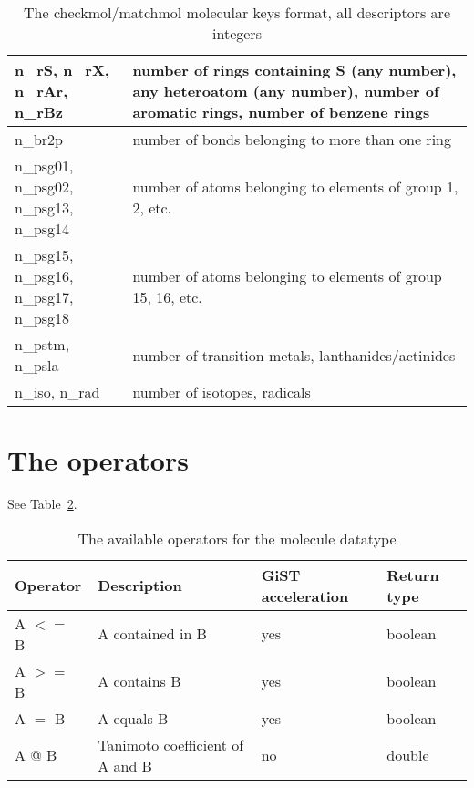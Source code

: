 \documentclass[a4paper]{article}
\begin{document}
\begin{table}[tbp]
\begin{tabular}{|l|p{8cm}|}
  \hline 
   n\_rS, n\_rX, n\_rAr, n\_rBz
  & number of rings containing S (any number), any heteroatom (any number), number of aromatic rings, number of benzene rings\\
  \hline 
   n\_br2p			& number of bonds belonging to more than one ring\\
   \hline 
   n\_psg01, n\_psg02, n\_psg13, n\_psg14
  & number of atoms belonging to elements of group 1, 2, etc.\\
  \hline 
   n\_psg15, n\_psg16, n\_psg17, n\_psg18
  & number of atoms belonging to elements of group 15, 16, etc.\\
  \hline 
   n\_pstm, n\_psla
  & number of transition metals, lanthanides/actinides\\
  \hline 
   n\_iso, n\_rad
  & number of isotopes, radicals\\
  \hline
\end{tabular}
\caption{The checkmol/matchmol molecular keys format, all descriptors are integers}
\label{tbl:fp_format}
\end{table}
\section{The operators}
See Table~\ref{tbl:mol_ops}.
\begin{table}[tbp]
\begin{tabular}{|l|l|l|l|}
\hline 
	\textbf{Operator} & \textbf{Description} & \textbf{GiST acceleration} & \textbf{Return type}\\
	\hline 
  A $<=$ B	& A contained in B & yes & boolean\\
  \hline 
  A $>=$ B	& A contains B & yes & boolean\\
  \hline 
  A $=$ B	& A equals B & yes & boolean\\
  \hline 
  A @ B	& Tanimoto coefficient of A and B & no & double\\
  \hline 
\end{tabular}
\caption{The available operators for the molecule datatype}
\label{tbl:mol_ops}
\end{table}
\end{document}
